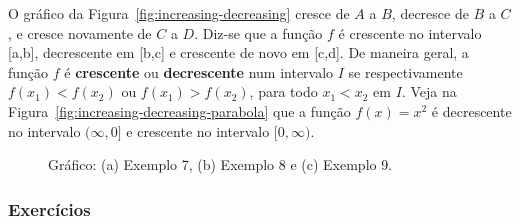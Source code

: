 O gráfico da Figura~\ref{fig:increasing-decreasing} cresce de $A$ a $B$, decresce de $B$ a $C$, e cresce novamente de $C$ a $D$. Diz-se que a função $f$ é crescente no intervalo [a,b], decrescente em [b,c] e crescente de novo em [c,d]. De maneira geral, a função $f$ é \textbf{crescente} ou \textbf{decrescente} num intervalo $I$ se respectivamente $f(x_1) < f(x_2)$ ou $f(x_1) > f(x_2)$, para todo $x_1 < x_2$ em $I$. Veja na Figura~\ref{fig:increasing-decreasing-parabola} que a função $f(x) = x^2$ é decrescente no intervalo $(\infty, 0]$ e crescente no intervalo $[0,\infty)$.
\vspace{-0.5cm}\begin{figure}[!ht]
  \centering
  \caption{Gráfico: (a) Exemplo 7, (b) Exemplo 8 e (c) Exemplo 9.}
  \vspace{-0.5cm}
\end{figure}

\subsubsection{Exercícios}

